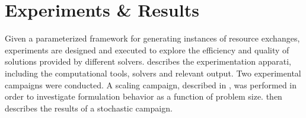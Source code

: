 \chapter{Experiments \& Results}\label{ch:results}

Given a parameterized framework for generating instances of resource exchanges,
experiments are designed and executed to explore the efficiency and quality of
solutions provided by different solvers.  describes the
experimentation apparati, including the computational tools, solvers and
relevant output. Two experimental campaigns were conducted. A scaling campaign,
described in , was performed in order to investigate
formulation behavior as a function of problem size. 
then describes the results of a stochastic campaign.







